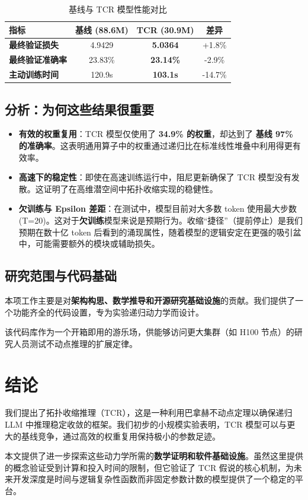 \documentclass[11pt, a4paper]{article}
\begin{document}
\begin{table}[h]
\centering
\begin{tabular}{lccc}
\toprule
\textbf{指标} & \textbf{基线 (88.6M)} & \textbf{TCR (30.9M)} & \textbf{差异} \\
\midrule
\textbf{最终验证损失} & 4.9429 & \textbf{5.0364} & +1.8\% \\
\textbf{最终验证准确率} & 23.83\% & \textbf{23.14\%} & -2.9\% \\
\textbf{主动训练时间} & 120.9s & \textbf{103.1s} & -14.7\% \\
\bottomrule
\end{tabular}
\caption{基线与 TCR 模型性能对比}
\label{tab:performance}
\end{table}

\subsection{分析：为何这些结果很重要}
\begin{itemize}
    \item \textbf{有效的权重复用}：TCR 模型仅使用了 \textbf{34.9\% 的权重}，却达到了 \textbf{基线 97\% 的准确率}。这表明通用算子中的权重通过递归比在标准线性堆叠中利用得更有效率。
    \item \textbf{高速下的稳定性}：即使在高速训练运行中，阻尼更新确保了 TCR 模型没有发散。这证明了在高维潜空间中拓扑收缩实现的稳健性。
    \item \textbf{欠训练与 Epsilon 差距}：在测试中，模型目前对大多数 token 使用最大步数 (T=20)。这对于\textbf{欠训练}模型来说是预期行为。收缩“捷径”（提前停止）是我们预期在数十亿 token 后看到的涌现属性，随着模型的逻辑安定在更强的吸引盆中，可能需要额外的模块或辅助损失。
\end{itemize}

\subsection{研究范围与代码基础}
本项工作主要是对\textbf{架构构思、数学推导和开源研究基础设施}的贡献。我们提供了一个功能齐全的代码设置，专为实验递归动力学而设计。

该代码库作为一个开箱即用的游乐场，供能够访问更大集群（如 H100 节点）的研究人员测试不动点推理的扩展定律。

\section{结论}
我们提出了拓扑收缩推理（TCR），这是一种利用巴拿赫不动点定理以确保递归 LLM 中推理稳定收敛的框架。我们初步的小规模实验表明，TCR 模型可以与更大的基线竞争，通过高效的权重复用保持极小的参数足迹。

本文提供了进一步探索这些动力学所需的\textbf{数学证明和软件基础设施}。虽然这里提供的概念验证受到计算和投入时间的限制，但它验证了 TCR 假说的核心机制，为未来开发深度是时间与逻辑复杂性函数而非固定参数计数的模型提供了一个稳定的平台。


\end{document}
